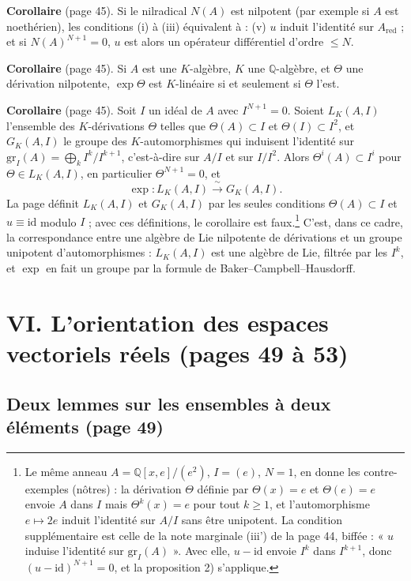 \documentclass[11pt,a4paper]{article}
\begin{document}
\textbf{Corollaire} (page 45). Si le nilradical $N(A)$ est nilpotent (par
exemple si $A$ est noethérien), les conditions (i) à (iii) équivalent à : (v)
$u$ induit l'identité sur $A_{\mathrm{red}}$ ; et si $N(A)^{N+1} = 0$, $u$ est
alors un opérateur différentiel d'ordre $\leqslant N$.

\textbf{Corollaire} (page 45). Si $A$ est une $K$-algèbre, $K$ une
$\mathbb{Q}$-algèbre, et $\Theta$ une dérivation nilpotente, $\exp \Theta$
est $K$-linéaire si et seulement si $\Theta$ l'est.

\textbf{Corollaire} (page 45). Soit $I$ un idéal de $A$ avec $I^{N+1} = 0$.
Soient $L_K(A, I)$ l'ensemble des $K$-dérivations $\Theta$ telles que
$\Theta(A) \subset I$ et $\Theta(I) \subset I^2$, et $G_K(A, I)$ le groupe
des $K$-automorphismes qui induisent l'identité sur
$\mathrm{gr}_I(A) = \bigoplus_k I^k / I^{k+1}$, c'est-à-dire sur $A/I$ et sur
$I/I^2$. Alors $\Theta^i(A) \subset I^i$ pour $\Theta \in L_K(A, I)$, en
particulier $\Theta^{N+1} = 0$, et
\[
\exp : L_K(A, I) \xrightarrow{\ \sim\ } G_K(A, I).
\]
La page définit $L_K(A, I)$ et $G_K(A, I)$ par les seules conditions
$\Theta(A) \subset I$ et $u \equiv \mathrm{id}$ modulo $I$ ; avec ces
définitions, le corollaire est faux.\footnote{Le même anneau
$A = \mathbb{Q}[x, e]/(e^2)$, $I = (e)$, $N = 1$, en donne les
contre-exemples (nôtres) : la dérivation $\Theta$ définie par
$\Theta(x) = e$ et $\Theta(e) = e$ envoie $A$ dans $I$ mais
$\Theta^k(x) = e$ pour tout $k \geqslant 1$, et l'automorphisme $e \mapsto
2e$ induit l'identité sur $A/I$ sans être unipotent. La condition
supplémentaire est celle de la note marginale (iii') de la page 44, biffée :
« $u$ induise l'identité sur $\mathrm{gr}_I(A)$ ». Avec elle, $u -
\mathrm{id}$ envoie $I^k$ dans $I^{k+1}$, donc
$(u - \mathrm{id})^{N+1} = 0$, et la proposition 2) s'applique.}
C'est, dans ce cadre, la correspondance entre une algèbre de Lie nilpotente
de dérivations et un groupe unipotent d'automorphismes : $L_K(A, I)$ est une
algèbre de Lie, filtrée par les $I^k$, et $\exp$ en fait un groupe par la
formule de Baker--Campbell--Hausdorff.

\section*{VI. L'orientation des espaces vectoriels réels (pages 49 à 53)}

\subsection*{Deux lemmes sur les ensembles à deux éléments (page 49)}
\end{document}
